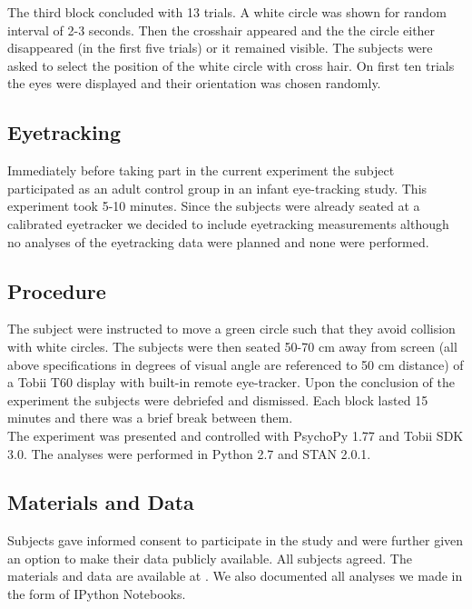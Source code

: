 \documentclass{article}
\begin{document}
The third block concluded with 13 trials. A white circle was shown for random interval of 2-3 seconds. Then the crosshair appeared and the the circle either disappeared (in the first five trials) or it remained visible. The subjects were asked to select the position of the white circle with cross hair. On first ten trials the eyes were displayed and their orientation was chosen randomly. \\
 
 
\subsection{Eyetracking}
Immediately before taking part in the current experiment the subject participated as an adult control group in an infant eye-tracking study. This experiment took 5-10 minutes. Since the subjects were already seated at a calibrated eyetracker we decided to include eyetracking measurements although no analyses of the eyetracking data were planned and none were performed.

\subsection{Procedure}
The subject were instructed to move a green circle such that they avoid collision with white circles. The subjects were then seated 50-70 cm away from screen (all above specifications in degrees of visual angle are referenced to 50 cm distance) of a Tobii T60 display with built-in remote eye-tracker. Upon the conclusion of the experiment the subjects were debriefed and dismissed. Each block lasted 15 minutes and there was a brief break between them.\\
The experiment was presented and controlled with PsychoPy 1.77 \citep{peirce07} and Tobii SDK 3.0. The analyses were performed in Python 2.7 and STAN 2.0.1.

\subsection{Materials and Data}
Subjects gave informed consent to participate in the study and were further given an option to make their data publicly available. All subjects agreed. The materials and data are available at . We also documented all analyses we made in the form of IPython Notebooks. 
\end{document}
